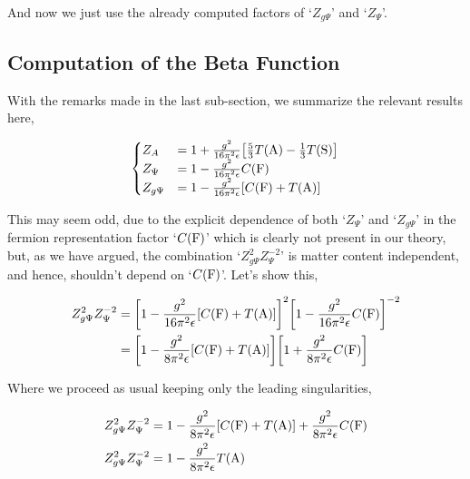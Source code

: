 And now we just use the already computed factors of `$Z_{g\Psi}$' and `$Z_\Psi$'.

\subsection{Computation of the Beta Function}

With the remarks made in the last sub-section, we summarize the relevant results here,

\begin{align}
    \begin{cases}
        Z_A&=1+\frac{g^2}{16\pi^2\epsilon}\qty[\frac{5}{3}T\qty(\textnormal{A})-\frac13T\qty(\textnormal{S})]\\
        Z_\Psi&=1-\frac{g^2}{16\pi^2\epsilon}C\qty(\textnormal{F})\\
        Z_{g\Psi}&=1-\frac{g^2}{16\pi^2\epsilon}\qty[C\qty(\textnormal F)+T\qty(\textnormal{A})]
    \end{cases}\nonumber
\end{align}

This may seem odd, due to the explicit dependence of both `$Z_\Psi$' and `$Z_{g\Psi}$' 
in the fermion representation factor `$C\qty(\textnormal{F})$' which is clearly 
not present in our theory, but, as we have argued, the combination `$Z_{g\Psi}^2Z_{\Psi}^{-2}$' 
is matter content independent, and hence, shouldn't depend on `$C\qty(\textnormal{F})$'. Let's 
show this,

\begin{align}
    Z_{g\Psi}^{2}Z_\Psi^{-2}&=\qty[1-\frac{g^2}{16\pi^2\epsilon}\qty[C\qty(\textnormal F)+T\qty(\textnormal{A})]]^2
    \qty[1-\frac{g^2}{16\pi^2\epsilon}C\qty(\textnormal{F})]^{-2}\nonumber\\
    &=\qty[1-\frac{g^2}{8\pi^2\epsilon}\qty[C\qty(\textnormal F)+T\qty(\textnormal{A})]]\qty[1+\frac{g^2}{8\pi^2\epsilon}C\qty(\textnormal{F})]\nonumber
\end{align}

Where we proceed as usual keeping only the leading singularities,

\begin{align}
    Z_{g\Psi}^{2}Z_\Psi^{-2}&=1-\frac{g^2}{8\pi^2\epsilon}\qty[C\qty(\textnormal F)+T\qty(\textnormal{A})]+\frac{g^2}{8\pi^2\epsilon}C\qty(\textnormal{F})\nonumber\\
    Z_{g\Psi}^{2}Z_\Psi^{-2}&=1-\frac{g^2}{8\pi^2\epsilon}T\qty(\textnormal{A})\nonumber
\end{align}

